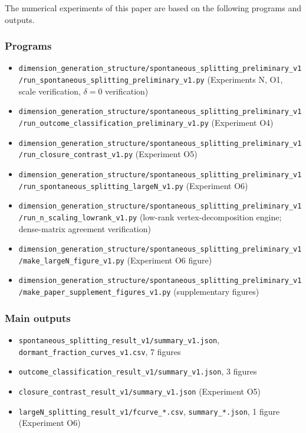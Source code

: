 \documentclass[
  a4paper,
]{article}
\providecommand{\tightlist}{%
  \setlength{\itemsep}{0pt}\setlength{\parskip}{0pt}}
\begin{document}
The numerical experiments of this paper are based on the following
programs and outputs.

\subsubsection{Programs}\label{programs}

\begin{itemize}
\tightlist
\item
  \texttt{dimension\_generation\_structure/spontaneous\_splitting\_preliminary\_v1/run\_spontaneous\_splitting\_preliminary\_v1.py}
  (Experiments N, O1, scale verification, \(\delta=0\) verification)
\item
  \texttt{dimension\_generation\_structure/spontaneous\_splitting\_preliminary\_v1/run\_outcome\_classification\_preliminary\_v1.py}
  (Experiment O4)
\item
  \texttt{dimension\_generation\_structure/spontaneous\_splitting\_preliminary\_v1/run\_closure\_contrast\_v1.py}
  (Experiment O5)
\item
  \texttt{dimension\_generation\_structure/spontaneous\_splitting\_preliminary\_v1/run\_spontaneous\_splitting\_largeN\_v1.py}
  (Experiment O6)
\item
  \texttt{dimension\_generation\_structure/spontaneous\_splitting\_preliminary\_v1/run\_n\_scaling\_lowrank\_v1.py}
  (low-rank vertex-decomposition engine; dense-matrix agreement
  verification)
\item
  \texttt{dimension\_generation\_structure/spontaneous\_splitting\_preliminary\_v1/make\_largeN\_figure\_v1.py}
  (Experiment O6 figure)
\item
  \texttt{dimension\_generation\_structure/spontaneous\_splitting\_preliminary\_v1/make\_paper\_supplement\_figures\_v1.py}
  (supplementary figures)
\end{itemize}

\subsubsection{Main outputs}\label{main-outputs}

\begin{itemize}
\tightlist
\item
  \texttt{spontaneous\_splitting\_result\_v1/summary\_v1.json},
  \texttt{dormant\_fraction\_curves\_v1.csv}, 7 figures
\item
  \texttt{outcome\_classification\_result\_v1/summary\_v1.json}, 3
  figures
\item
  \texttt{closure\_contrast\_result\_v1/summary\_v1.json} (Experiment
  O5)
\item
  \texttt{largeN\_splitting\_result\_v1/fcurve\_*.csv},
  \texttt{summary\_*.json}, 1 figure (Experiment O6)
\end{itemize}
\end{document}

